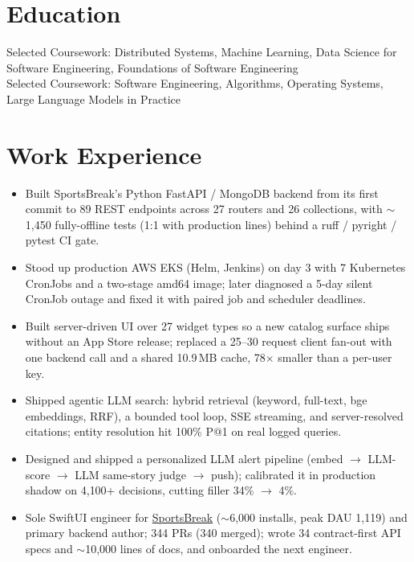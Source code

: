 \documentclass[11pt, letterpaper]{article}
\begin{document}

\section{Education}
Selected Coursework: Distributed Systems, Machine Learning, Data Science for Software Engineering, Foundations of Software Engineering\\[1pt]
Selected Coursework: Software Engineering, Algorithms, Operating Systems, Large Language Models in Practice

\section{Work Experience}
\begin{itemize}
  \item Built SportsBreak's Python FastAPI / MongoDB backend from its first commit to 89 REST endpoints across 27 routers and 26 collections, with $\sim$1{,}450 fully-offline tests (1:1 with production lines) behind a ruff / pyright / pytest CI gate.
  \item Stood up production AWS EKS (Helm, Jenkins) on day 3 with 7 Kubernetes CronJobs and a two-stage amd64 image; later diagnosed a 5-day silent CronJob outage and fixed it with paired job and scheduler deadlines.
  \item Built server-driven UI over 27 widget types so a new catalog surface ships without an App Store release; replaced a 25--30 request client fan-out with one backend call and a shared 10.9\,MB cache, 78$\times$ smaller than a per-user key.
  \item Shipped agentic LLM search: hybrid retrieval (keyword, full-text, bge embeddings, RRF), a bounded tool loop, SSE streaming, and server-resolved citations; entity resolution hit 100\% P@1 on real logged queries.
  \item Designed and shipped a personalized LLM alert pipeline (embed $\to$ LLM-score $\to$ LLM same-story judge $\to$ push); calibrated it in production shadow on 4{,}100+ decisions, cutting filler 34\% $\to$ 4\%.
  \item Sole SwiftUI engineer for \href{https://apps.apple.com/app/id6762649287}{SportsBreak} ($\sim$6{,}000 installs, peak DAU 1{,}119) and primary backend author; 344 PRs (340 merged); wrote 34 contract-first API specs and $\sim$10{,}000 lines of docs, and onboarded the next engineer.
\end{itemize}
\end{document}
